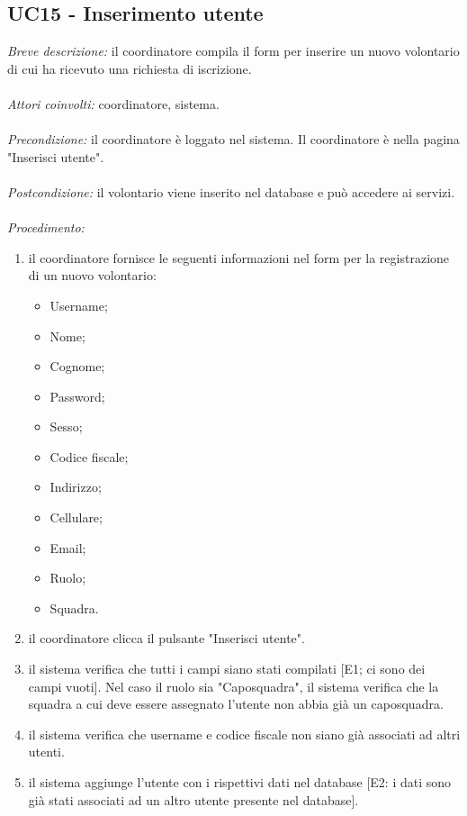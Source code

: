 \subsection{UC15 - Inserimento utente}
\textit{Breve descrizione:} il coordinatore compila il form per inserire un nuovo volontario di cui ha ricevuto una richiesta di iscrizione. 
\\
\\
\textit{Attori coinvolti:} coordinatore, sistema.
\\
\\
\textit{Precondizione:} il coordinatore è loggato nel sistema. Il coordinatore è nella pagina "Inserisci utente".
\\
\\
\textit{Postcondizione:} il volontario viene inserito nel database e può accedere ai servizi.
\\
\\
\textit{Procedimento:}
\begin{enumerate}
	\item il coordinatore fornisce le seguenti informazioni nel form per la registrazione di un nuovo volontario:
	\begin{itemize}
		\item Username;
		\item Nome;
		\item Cognome;
		\item Password;
		\item Sesso;
		\item Codice fiscale;
		\item Indirizzo;
		\item Cellulare;
		\item Email;
		\item Ruolo;
		\item Squadra.
	\end{itemize}
	\item il coordinatore clicca il pulsante "Inserisci utente".
	\item il sistema verifica che tutti i campi siano stati compilati [E1; ci sono dei campi vuoti]. Nel caso il ruolo sia "Caposquadra", il sistema verifica che la squadra a cui deve essere assegnato l'utente non abbia già un caposquadra.
	\item il sistema verifica che username e codice fiscale non siano già associati ad altri utenti.
	\item il sistema aggiunge l'utente con i rispettivi dati nel database [E2: i dati sono già stati associati ad un altro utente presente nel database].
\end{enumerate}



